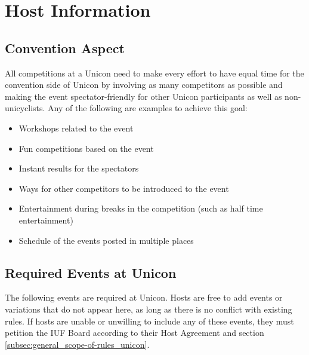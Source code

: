 \chapter{Host Information}

\section{Convention Aspect}

All competitions at a Unicon need to make every effort to have equal time for the convention side of Unicon by involving as many competitors as possible and making the event spectator-friendly for other Unicon participants as well as non-unicyclists.
Any of the following are examples to achieve this goal:
\begin{itemize}
  \item Workshops related to the event
  \item Fun competitions based on the event
  \item Instant results for the spectators
  \item Ways for other competitors to be introduced to the event
  \item Entertainment during breaks in the competition (such as half time entertainment)
  \item Schedule of the events posted in multiple places
\end{itemize}

\section{Required Events at Unicon}

The following events are required at Unicon.
Hosts are free to add events or variations that do not appear here, as long as there is no conflict with existing rules.
If hosts are unable or unwilling to include any of these events, they must petition the IUF Board according to their Host Agreement and section \ref{subsec:general_scope-of-rules_unicon}.

